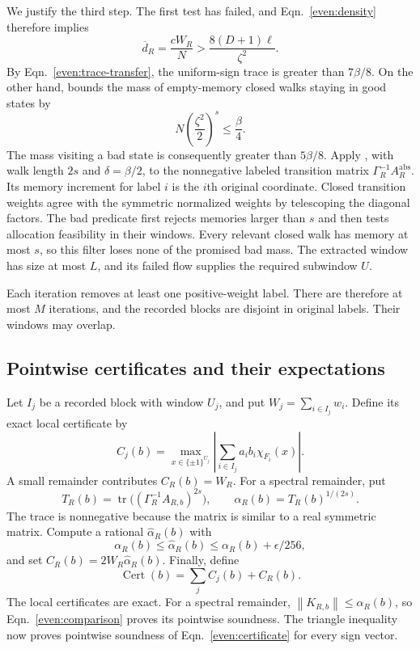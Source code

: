 \documentclass[letterpaper,11pt]{article}
\theoremstyle{definition}
\newcommand{\norm}[1]{\left\lVert#1\right\rVert}
\newcommand{\abs}[1]{\left|#1\right|}
\DeclareMathOperator{\tr}{tr}
\begin{document}
We justify the third step. The first test has failed, and
Eqn.~\eqref{even:density} therefore implies
\[
 \overline d_R=\frac{cW_R}{N}
 >\frac{8(D+1)\ell}{\zeta^2}.
\]
By Eqn.~\eqref{even:trace-transfer}, the uniform-sign trace is greater
than $7\beta/8$. On the other hand,  bounds the
mass of empty-memory closed walks staying in good states by
\[
 N\left(\frac{\zeta^2}{2}\right)^s\leq\frac\beta4.
\]
The mass visiting a bad state is consequently greater than $5\beta/8$.
Apply , with walk length $2s$ and
$\delta=\beta/2$, to the nonnegative labeled transition matrix
$\Gamma_R^{-1}A_R^{\mathrm{abs}}$. Its memory increment for label $i$
is the $i$th original coordinate. Closed transition weights agree with
the symmetric normalized weights by telescoping the diagonal factors.
The bad predicate first rejects memories larger than $s$ and then tests
allocation feasibility in their windows. Every relevant closed walk has
memory at most $s$, so this filter loses none of the promised bad mass.
The extracted window has size at most $L$, and its failed flow supplies
the required subwindow $U$.

Each iteration removes at least one positive-weight label. There are
therefore at most $M$ iterations, and the recorded blocks are disjoint
in original labels. Their windows may overlap.

\subsection{Pointwise certificates and their expectations}

Let $I_j$ be a recorded block with window $U_j$, and put
$W_j=\sum_{i\in I_j}w_i$. Define its exact local certificate by
\[
 C_j(b)=\max_{x\in\{\pm1\}^{U_j}}
       \abs{\sum_{i\in I_j}a_i b_i\chi_{F_i}(x)}.
\]
A small remainder contributes $C_R(b)=W_R$.
For a spectral remainder, put
\[
 T_R(b)=\tr\bigl((\Gamma_R^{-1}A_{R,b})^{2s}\bigr),
 \qquad \alpha_R(b)=T_R(b)^{1/(2s)}.
\]
The trace is nonnegative because the matrix is similar to a real
symmetric matrix. Compute a rational $\widehat\alpha_R(b)$ with
\[
 \alpha_R(b)\leq\widehat\alpha_R(b)
 \leq\alpha_R(b)+\epsilon/256,
\]
and set $C_R(b)=2W_R\widehat\alpha_R(b)$.
Finally, define
\begin{equation}\label{even:certificate}
 \operatorname{Cert}(b)=\sum_j C_j(b)+C_R(b).
\end{equation}
The local certificates are exact. For a spectral remainder,
$\norm{K_{R,b}}\leq\alpha_R(b)$, so
Eqn.~\eqref{even:comparison} proves its pointwise soundness.
The triangle inequality now proves pointwise soundness of
Eqn.~\eqref{even:certificate} for every sign vector.
\end{document}
